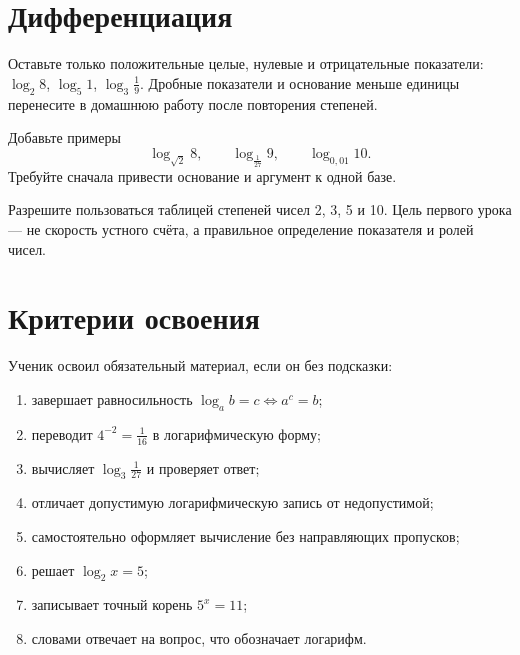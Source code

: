 \section{Дифференциация}

\begin{teacherbox}
  Оставьте только положительные целые, нулевые и отрицательные показатели:
  \(\log_2 8\), \(\log_5 1\), \(\log_3\frac19\). Дробные показатели и
  основание меньше единицы перенесите в домашнюю работу после повторения
  степеней.
\end{teacherbox}

\begin{teacherbox}
  Добавьте примеры
  \[
    \log_{\sqrt2}8,
    \qquad
    \log_{\frac1{27}}9,
    \qquad
    \log_{0{,}01}10.
  \]
  Требуйте сначала привести основание и аргумент к одной базе.
\end{teacherbox}

\begin{teacherbox}
  Разрешите пользоваться таблицей степеней чисел 2, 3, 5 и 10. Цель
  первого урока --- не скорость устного счёта, а правильное определение
  показателя и ролей чисел.
\end{teacherbox}

\section{Критерии освоения}

\begin{questionsbox}
  Ученик освоил обязательный материал, если он без подсказки:
  \begin{enumerate}
    \item завершает равносильность
      \(\log_a b=c\Longleftrightarrow a^c=b\);
    \item переводит \(4^{-2}=\frac1{16}\) в логарифмическую форму;
    \item вычисляет \(\log_3\frac1{27}\) и проверяет ответ;
    \item отличает допустимую логарифмическую запись от недопустимой;
    \item самостоятельно оформляет вычисление без направляющих пропусков;
    \item решает \(\log_2 x=5\);
    \item записывает точный корень \(5^x=11\);
    \item словами отвечает на вопрос, что обозначает логарифм.
  \end{enumerate}
\end{questionsbox}

